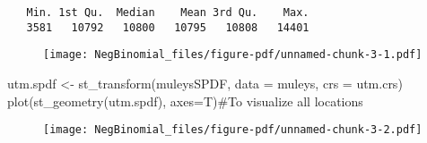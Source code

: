 \documentclass[
  letterpaper,
]{book}
\newenvironment{Shaded}{\begin{snugshade}}{\end{snugshade}}
\newcommand{\AttributeTok}[1]{\textcolor[rgb]{0.40,0.45,0.13}{#1}}
\newcommand{\CommentTok}[1]{\textcolor[rgb]{0.37,0.37,0.37}{#1}}
\newcommand{\DecValTok}[1]{\textcolor[rgb]{0.68,0.00,0.00}{#1}}
\newcommand{\DocumentationTok}[1]{\textcolor[rgb]{0.37,0.37,0.37}{\textit{#1}}}
\newcommand{\FunctionTok}[1]{\textcolor[rgb]{0.28,0.35,0.67}{#1}}
\newcommand{\NormalTok}[1]{\textcolor[rgb]{0.00,0.23,0.31}{#1}}
\newcommand{\OtherTok}[1]{\textcolor[rgb]{0.00,0.23,0.31}{#1}}
\newcommand{\SpecialCharTok}[1]{\textcolor[rgb]{0.37,0.37,0.37}{#1}}
\newcommand{\StringTok}[1]{\textcolor[rgb]{0.13,0.47,0.30}{#1}}
\begin{document}
\begin{verbatim}
   Min. 1st Qu.  Median    Mean 3rd Qu.    Max. 
   3581   10792   10800   10795   10808   14401 
\end{verbatim}

\begin{Shaded}
\end{Shaded}

\begin{figure}[H]

{\centering \texttt{[image: NegBinomial\_files/figure-pdf/unnamed-chunk-3-1.pdf]}

}

\end{figure}

\begin{Shaded}
\begin{Highlighting}[]
\NormalTok{utm.spdf }\OtherTok{\textless{}{-}} \FunctionTok{st\_transform}\NormalTok{(muleysSPDF, }\AttributeTok{data =}\NormalTok{ muleys, }\AttributeTok{crs =}\NormalTok{ utm.crs)}
\FunctionTok{plot}\NormalTok{(}\FunctionTok{st\_geometry}\NormalTok{(utm.spdf), }\AttributeTok{axes=}\NormalTok{T)}\CommentTok{\#To visualize all locations}
\end{Highlighting}
\end{Shaded}

\begin{figure}[H]

{\centering \texttt{[image: NegBinomial\_files/figure-pdf/unnamed-chunk-3-2.pdf]}

}

\end{figure}
\end{document}
